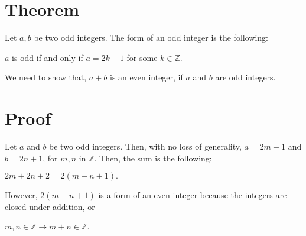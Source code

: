 \documentclass{article}
\begin{document}
\section{Theorem}

Let $a, b$ be two odd integers. The form of an odd integer is the following:
\begin{center}
    $a$ is odd if and only if $a = 2k+1$ for some $k \in \mathbb{Z}$.
\end{center}

We need to show that, $a+b$ is an even integer, if $a$ and $b$ are odd integers.

\section{Proof}

Let $a$ and $b$ be two odd integers. Then, with no loss of generality, $a= 2m+1$ and $b=2n+1$, for $m, n$ in $\mathbb{Z}$. Then, the sum is the following:
\begin{center}
    $2m+ 2n+2 = 2(m+n+1).$
\end{center}
However, $2(m+n+1)$ is a form of an even integer because the integers are closed under addition, or

\begin{center}
    $m, n \in \mathbb{Z} \to m+n \in \mathbb{Z}$.
\end{center}
\end{document}
